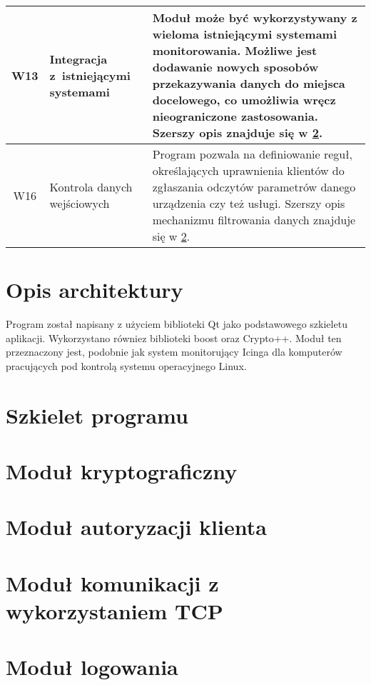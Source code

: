 \begin{longtable}[c]{|c||p{3.5cm}|p{9cm}|}
  W13 & \raggedright{Integracja z~istniejącymi systemami} & \raggedright{Moduł może być wykorzystywany z wieloma istniejącymi systemami monitorowania. Możliwe jest dodawanie nowych sposobów przekazywania danych do miejsca docelowego, co umożliwia wręcz nieograniczone zastosowania. Szerszy opis znajduje się w \ref{sec:ModBase}.} \tabularnewline
  \hline

  W16 & \raggedright{Kontrola danych wejściowych} & \raggedright{Program pozwala na definiowanie reguł, określających uprawnienia klientów do zgłaszania odczytów parametrów danego urządzenia czy też usługi. Szerszy opis mechanizmu filtrowania danych znajduje się w \ref{sec:ModBase}.} \tabularnewline
  \hline

\end{longtable}

\section[Opis architektury][Opis architektury]{Opis architektury}

Program został napisany z użyciem biblioteki Qt jako podstawowego
szkieletu aplikacji. Wykorzystano równiez biblioteki boost oraz
Crypto++. Moduł ten przeznaczony jest, podobnie jak system
monitorujący Icinga dla komputerów pracujących pod kontrolą systemu
operacyjnego Linux.

\section[Szkielet programu][Szkielet programu]{Szkielet programu}
\label{sec:ModBase}

\section[Moduł kryptograficzny][Moduł kryptograficzny]{Moduł kryptograficzny}
\label{sec:ModCrypto}

\section[Moduł autoryzacyjny][Moduł autoryzacji klienta]{Moduł autoryzacji klienta}
\label{sec:ModAuth}

\section[Moduł TCP][Moduł komunikacji z wykorzystaniem TCP]{Moduł komunikacji z wykorzystaniem TCP}

\section[Moduł logowania][Moduł logowania]{Moduł logowania}
